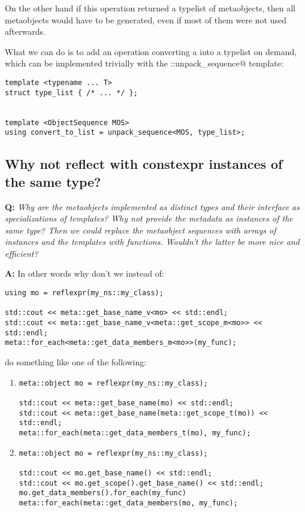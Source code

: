 On the other hand if this operation returned a typelist of metaobjects,
then all metaobjects would have to be generated, even if most of them
were not used afterwards.

What we can do is to add an operation converting a 
into a typelist on demand, which can be implemented trivially with the
\verb@meta::unpack_sequence@ template:

\begin{verbatim}
template <typename ... T>
struct type_list { /* ... */ };


template <ObjectSequence MOS>
using convert_to_list = unpack_sequence<MOS, type_list>;
\end{verbatim}

\subsection{Why not reflect with constexpr instances of the same type?}

\textbf{Q:} {\em Why are the metaobjects implemented as distinct types and
their interface as specializations of templates? Why not provide the metadata
as \verb@constexpr@ instances of the same type? Then we could replace the metaobject
sequences with arrays of \verb@constexpr@ instances and the templates with
\verb@constexpr@ functions. Wouldn't the latter be more nice and efficient?}

\textbf{A:}
In other words why don't we instead of:

\begin{verbatim}
using mo = reflexpr(my_ns::my_class);

std::cout << meta::get_base_name_v<mo> << std::endl;
std::cout << meta::get_base_name_v<meta::get_scope_m<mo>> << std::endl;
meta::for_each<meta::get_data_members_m<mo>>(my_func);
\end{verbatim}

do something like one of the following:

\begin{enumerate}[label=\textbf{\Alph*)}]

\item
\begin{verbatim}
meta::object mo = reflexpr(my_ns::my_class);

std::cout << meta::get_base_name(mo) << std::endl;
std::cout << meta::get_base_name(meta::get_scope_t(mo)) << std::endl;
meta::for_each(meta::get_data_members_t(mo), my_func);
\end{verbatim}

\item
\begin{verbatim}
meta::object mo = reflexpr(my_ns::my_class);

std::cout << mo.get_base_name() << std::endl;
std::cout << mo.get_scope().get_base_name() << std::endl;
mo.get_data_members().for_each(my_func)
meta::for_each(meta::get_data_members(mo, my_func);
\end{verbatim}

\end{enumerate}

